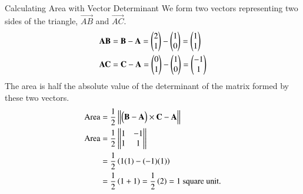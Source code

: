 \documentclass{beamer}
\begin{document}
\begin{frame}{Calculating Area with Vector Determinant}
We form two vectors representing two sides of the triangle, $\vec{AB}$ and $\vec{AC}$.
\begin{align}  
\mathbf{AB} &= \mathbf{B} - \mathbf{A} = \begin{pmatrix}2 \\ 1\end{pmatrix} - \begin{pmatrix}1 \\ 0\end{pmatrix} = \begin{pmatrix}1 \\ 1\end{pmatrix} \\
\mathbf{AC} &= \mathbf{C} - \mathbf{A} = \begin{pmatrix}0 \\ 1\end{pmatrix} - \begin{pmatrix}1 \\ 0\end{pmatrix} = \begin{pmatrix}-1 \\ 1\end{pmatrix}
\end{align}  
The area is half the absolute value of the determinant of the matrix formed by these two vectors.
\begin{align}  
\text{Area} &=\frac{1}{2}\left\vert\begin{vmatrix}\begin{pmatrix}{\mathbf{B}-\mathbf{A}}\end{pmatrix}\times{\mathbf{C}-\mathbf{A}}\end{vmatrix}\right\vert \\
\text{Area} &= \frac{1}{2} \left\vert\begin{vmatrix}1 & -1 \\ 1 & 1\end{vmatrix}\right\vert \\
&= \frac{1}{2} \left(1(1) - (-1)(1)\right) \\
&= \frac{1}{2} \left(1 + 1\right) = \frac{1}{2} \left(2\right) = 1 \text{ square unit.}
\end{align}
\end{frame}
\end{document}
